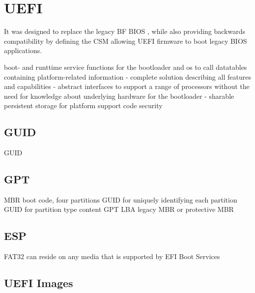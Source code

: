 
\section{\acf{UEFI}}

It was designed to replace the legacy \acl{BF} \ac{BIOS} , while also providing backwards compatibility by defining the \acf{CSM} allowing \ac{UEFI} firmware to boot legacy \ac{BIOS} applications.

boot- and runttime service functions for the bootloader and os to call
datatables containing platform-related information
- complete solution describing all features and capabilities
- abstract interfaces to support a range of processors without the need for knowledge about underlying hardware for the bootloader
- sharable persistent storage for platform support code
security

\subsection{\acf{GUID}}
\ac{GUID}

\subsection{\acf{GPT}}
\ac{MBR} boot code, four partitions
\ac{GUID} for uniquely identifying each partition
\ac{GUID} for partition type content
\ac{GPT}
\ac{LBA}
legacy \ac{MBR} or protective \ac{MBR}

\cite[5]{uefi-spec}

\subsection{\acf{ESP}}
\ac{FAT}32 \cite[13.3]{uefi-spec}
can reside on any media that is supported by EFI Boot Services
\cite[13.3.1]{uefi-spec}


\subsection{\acs{UEFI} Images}


